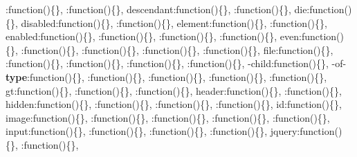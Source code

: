 {\begin{DoxyParamCaption}
\textquotesingle{}\+:function()\{\}, \textquotesingle{}\+:function()\{\}, \textquotesingle{}descendant\textquotesingle{}\+:function()\{\}, \textquotesingle{}\+:function()\{\}, \textquotesingle{}die\textquotesingle{}\+:function()\{\}, \textquotesingle{}disabled\textquotesingle{}\+:function()\{\}, \textquotesingle{}\+:function()\{\}, \textquotesingle{}element\textquotesingle{}\+:function()\{\}, \textquotesingle{}\+:function()\{\}, \textquotesingle{}enabled\textquotesingle{}\+:function()\{\}, \textquotesingle{}\+:function()\{\}, \textquotesingle{}\+:function()\{\}, \textquotesingle{}\+:function()\{\}, \textquotesingle{}even\textquotesingle{}\+:function()\{\}, \textquotesingle{}\+:function()\{\}, \textquotesingle{}\+:function()\{\}, \textquotesingle{}\+:function()\{\}, \textquotesingle{}\+:function()\{\}, \textquotesingle{}file\textquotesingle{}\+:function()\{\}, \textquotesingle{}\+:function()\{\}, \textquotesingle{}\+:function()\{\}, \textquotesingle{}\+:function()\{\}, \textquotesingle{}\+:function()\{\}, -\/child\textquotesingle{}\+:function()\{\}, -\/of-\/{\bf type}\textquotesingle{}\+:function()\{\}, \textquotesingle{}\+:function()\{\}, \textquotesingle{}\+:function()\{\}, \textquotesingle{}\+:function()\{\}, \textquotesingle{}\+:function()\{\}, \textquotesingle{}gt\textquotesingle{}\+:function()\{\}, \textquotesingle{}\+:function()\{\}, \textquotesingle{}\+:function()\{\}, \textquotesingle{}header\textquotesingle{}\+:function()\{\}, \textquotesingle{}\+:function()\{\}, \textquotesingle{}hidden\textquotesingle{}\+:function()\{\}, \textquotesingle{}\+:function()\{\}, \textquotesingle{}\+:function()\{\}, \textquotesingle{}\+:function()\{\}, \textquotesingle{}id\textquotesingle{}\+:function()\{\}, \textquotesingle{}image\textquotesingle{}\+:function()\{\}, \textquotesingle{}\+:function()\{\}, \textquotesingle{}\+:function()\{\}, \textquotesingle{}\+:function()\{\}, \textquotesingle{}\+:function()\{\}, \textquotesingle{}input\textquotesingle{}\+:function()\{\}, \textquotesingle{}\+:function()\{\}, \textquotesingle{}\+:function()\{\}, \textquotesingle{}\+:function()\{\}, \textquotesingle{}jquery\textquotesingle{}\+:function()\{\}, \textquotesingle{}\+:function()\{\}, 
\end{DoxyParamCaption}}

